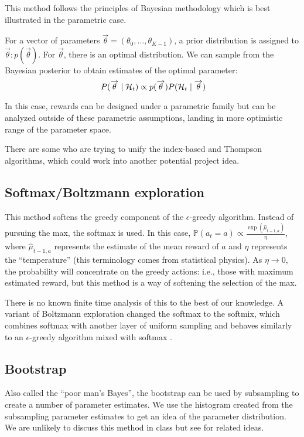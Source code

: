 \documentclass[11pt]{article}
\begin{document}
This method follows the principles of Bayesian methodology which is best illustrated in the parametric case.

For a vector of parameters $\overrightarrow {\theta} = (\theta_0, \ldots, \theta_{K-1})$, a prior distribution is assigned to $\overrightarrow {\theta} : p(\overrightarrow{\theta})$.  For $\overrightarrow{\theta}$, there is an optimal distribution.  We can sample from the Bayesian posterior to obtain estimates of the optimal parameter: 
\[
\ P(\overrightarrow{\theta} \mid \mathcal{H}_{t}) \propto p(\overrightarrow{\theta}) P(\mathcal{H}_{t} \mid \overrightarrow{\theta})
\]

In this case, rewards can be designed under a parametric family but can be analyzed outside of these parametric assumptions, landing in more optimistic range of the parameter space.

There are some who are trying to unify the index-based and Thompson algorithms, which could work into another potential project idea.

\subsection{Softmax/Boltzmann exploration}
This method softens the greedy component of the $\epsilon$-greedy algorithm.  Instead of pursuing the max, the softmax is used.  In this case, $\mathbb{P}(a_{t}=a) \propto \frac{\exp(\hat{\mu}_{t-1,a})}{\eta}$, where $\hat{\mu}_{t-1,a}$ represents the estimate of the mean reward of $a$ and $\eta$ represents the ``temperature'' (this terminology comes from statistical physics).  As $\eta\rightarrow 0$, the probability will concentrate on the greedy actions: i.e., those with maximum estimated reward, but this method is a way of softening the selection of the max.

There is no known finite time analysis of this to the best of our knowledge.  A variant of Boltzmann exploration changed the softmax to the softmix, which combines softmax with another layer of uniform sampling and behaves similarly to an $\epsilon$-greedy algorithm mixed with softmax \cite{cesabianchi1998finite}.

\subsection{Bootstrap}
Also called the ``poor man's Bayes'', the bootstrap can be used by subsampling to create a number of parameter estimates.  We use the histogram created from the subsampling parameter estimates to get an idea of the parameter distribution.  We are unlikely to discuss this method in class but see \cite{eckles2014thompson,baransi2014sub,osband2015bootstrapped} for related ideas.
 
\end{document}
